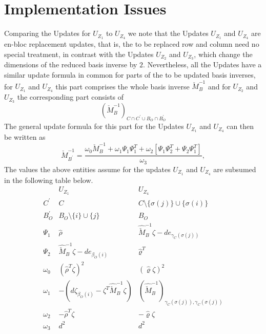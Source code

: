 \documentclass[a4paper]{article}
\begin{document}
\section{Implementation Issues}
Comparing the Updates for $U_{Z_{1}}$ to $U_{Z_{4}}$ we note that the Updates
$U_{Z_{1}}$ and $U_{Z_{4}}$ are en-bloc replacement updates, that is, the to be
replaced row and column need no special treatment, in contrast with the Updates
$U_{Z_{2}}$ and $U_{Z_{3}}$, which change the dimensions of the reduced basis
inverse by $2$. Nevertheless, all the Updates have a similar update
formula in common for parts of the to be updated basis inverses,
for $U_{Z_{1}}$ and $U_{Z_{4}}$ this part comprises the whole
basis inverse $\check{M}_{B}^{-1}$ and for $U_{Z_{2}}$
and $U_{Z_{3}}$ the corresponding part consists of  
\begin{equation}
\left(
 \check{M}_{B}^{-1}
\right)_{C \cap C^{\prime} \cup B_{O} \cap B_{O}^{\prime}}
\end{equation}
The general update formula for this part for the Updates
$U_{Z_{1}}$ and $U_{Z_{4}}$ can then be written as 
\begin{equation}
\check{M}_{B^{\prime}}^{-1}
=
\frac{
\omega_{0}\check{M}_{B}^{-1}
+\omega_{1}\Psi_{1}\Psi_{1}^{T}
+\omega_{2}\left[\Psi_{1}\Psi_{2}^{T}+\Psi_{2}\Psi_{1}^{T}\right]
}{\omega_{3}},
\end{equation}
The values the above entities assume for the updates $U_{Z_{1}}$ and
$U_{Z_{4}}$ are subsumed in the following table below.
\begin{equation}
\begin{array}{c|cc}
& U_{Z_{1}} & U_{Z_{4}} \\
\hline
C^{\prime}
& C
& C \setminus \{\sigma(j)\} \cup \{\sigma(i)\}
\\
B_{O}^{\prime}
& B_{O} \setminus \{i\} \cup \{j\}
& B_{O}
\\
\Psi_{1}
& \hat{\rho}
& \hat{\check{M}}_{B}^{-1}\zeta-de_{\gamma_{C}(\sigma(j))}
\\
\Psi_{2}
& \hat{\check{M}}_{B}^{-1}\zeta-de_{\beta_{O}(i)}
& \hat{\varrho}^{T}
\\
\omega_{0}
& \left(\hat{\rho}^{T}\zeta\right)^{2}
& \left(\hat{\varrho}\zeta\right)^{2}
\\
\omega_{1}
& -\left(
   d\zeta_{\beta_{O}(i)}-\zeta^{T}\hat{\check{M}}_{B}^{-1}\zeta
  \right) 
& \left(
   \hat{\check{M}}_{B}^{-1}
  \right)_{\gamma_{C}(\sigma(j)), \gamma_{C}(\sigma(j))} 
\\
\omega_{2}
& -\hat{\rho}^{T}\zeta
& -\hat{\varrho}\zeta
\\
\omega_{3}
& d^{2}
& d^{2}
\end{array}
\end{equation}
 
\end{document}
